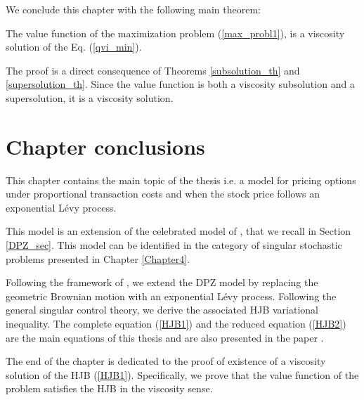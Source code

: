 \noindent
We conclude this chapter with the following main theorem:
\begin{Theorem}
 The value function of the maximization problem (\ref{max_probl1}), is a viscosity solution of the Eq. (\ref{qvi_min}).
\end{Theorem}
The proof is a direct consequence of Theorems \ref{subsolution_th} and \ref{supersolution_th}. Since the value function is both a viscosity 
subsolution and a supersolution, it is a viscosity solution.



\section{Chapter conclusions}


This chapter contains the main topic of the thesis i.e. a model for pricing options under proportional transaction costs and when the 
stock price follows an exponential Lévy process.

This model is an extension of the celebrated model of \cite{DaPaZa93}, that we recall in Section \ref{DPZ_sec}.
This model can be identified in the category of singular stochastic problems presented in Chapter \ref{Chapter4}. 

Following the framework of \cite{Kab16},
we extend the DPZ model  
by replacing the geometric Brownian motion with an exponential Lévy process. 
Following the general singular control theory, we derive the associated HJB variational inequality. The complete equation (\ref{HJB1}) and the reduced equation (\ref{HJB2})
are the main equations of this thesis and are also presented in the paper \cite{Canta}.

The end of the chapter is dedicated to the proof of existence of a viscosity solution of the HJB (\ref{HJB1}).
Specifically, we prove that the value function of the problem satisfies the HJB in the viscosity sense.
















